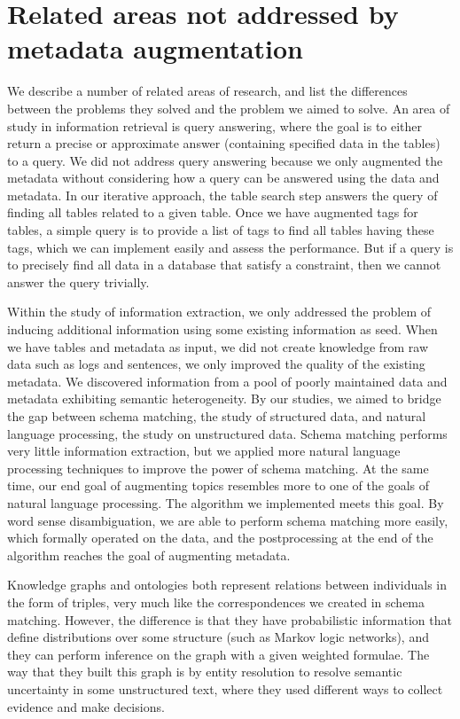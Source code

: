 \section{Related areas not addressed by metadata augmentation}
\label{sec:RelatedAreasNotAddressedByMetadataAugmentation}

We describe a number of related areas of research, and list the differences between the problems they solved and the problem we aimed to solve. An area of study in information retrieval is query answering, where the goal is to either return a precise or approximate answer (containing specified data in the tables) to a query. We did not address query answering because we only augmented the metadata without considering how a query can be answered using the data and metadata. In our iterative approach, the table search step answers the query of finding all tables related to a given table. Once we have augmented tags for tables, a simple query is to provide a list of tags to find all tables having these tags, which we can implement easily and assess the performance. But if a query is to precisely find all data in a database that satisfy a constraint, then we cannot answer the query trivially.

Within the study of information extraction, we only addressed the problem of inducing additional information using some existing information as seed. When we have tables and metadata as input, we did not create knowledge from raw data such as logs and sentences, we only improved the quality of the existing metadata. We discovered information from a pool of poorly maintained data and metadata exhibiting semantic heterogeneity. By our studies, we aimed to bridge the gap between schema matching, the study of structured data, and natural language processing, the study on unstructured data. Schema matching performs very little information extraction, but we applied more natural language processing techniques to improve the power of schema matching. At the same time, our end goal of augmenting topics resembles more to one of the goals of natural language processing. The algorithm we implemented meets this goal. By word sense disambiguation, we are able to perform schema matching more easily, which formally operated on the data, and the postprocessing at the end of the algorithm reaches the goal of augmenting metadata.

Knowledge graphs and ontologies both represent relations between individuals in the form of triples, very much like the correspondences we created in schema matching. However, the difference is that they have probabilistic information that define distributions over some structure (such as Markov logic networks), and they can perform inference on the graph with a given weighted formulae. The way that they built this graph is by entity resolution to resolve semantic uncertainty in some unstructured text, where they used different ways to collect evidence and make decisions.

